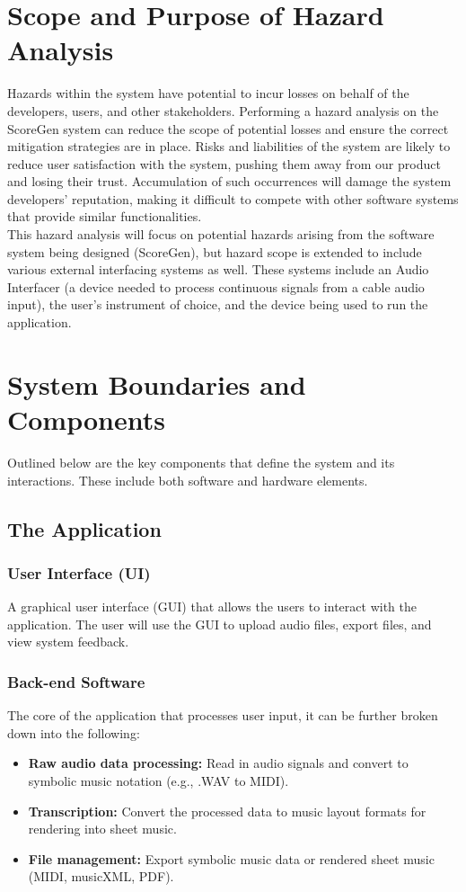 \documentclass{article}
\begin{document}
\section{Scope and Purpose of Hazard Analysis}

Hazards within the system have potential to incur losses on behalf of the developers, users, and other stakeholders. 
Performing a hazard analysis on the ScoreGen system can reduce the scope of potential losses and ensure the correct 
mitigation strategies are in place. Risks and liabilities of the system are likely to reduce user satisfaction with 
the system, pushing them away from our product and losing their trust. Accumulation of such occurrences will damage 
the system developers’ reputation, making it difficult to compete with other software systems that provide similar 
functionalities. \\

\noindent
This hazard analysis will focus on potential hazards arising from the software system being designed (ScoreGen), but 
hazard scope is extended to include various external interfacing systems as well. These systems include an Audio 
Interfacer (a device needed to process continuous signals from a cable audio input), the user’s instrument of choice, 
and the device being used to run the application.


\section{System Boundaries and Components}
Outlined below are the key components that define the system and its interactions. These include both software and hardware elements.  
\subsection{The Application}
\subsubsection{User Interface (UI)}
A graphical user interface (GUI) that allows the users to interact with the application. The user will use the GUI to upload audio files, 
export files, and view system feedback.

\subsubsection{Back-end Software}
The core of the application that processes user input, it can be further broken down into the following:
\begin{itemize}
    \item \textbf{Raw audio data processing:} Read in audio signals and convert to symbolic music notation (e.g., .WAV to MIDI).
    \item \textbf{Transcription:} Convert the processed data to music layout formats for rendering into sheet music.
    \item \textbf{File management:} Export symbolic music data or rendered sheet music (MIDI, musicXML, PDF).
\end{itemize}
\end{document}
